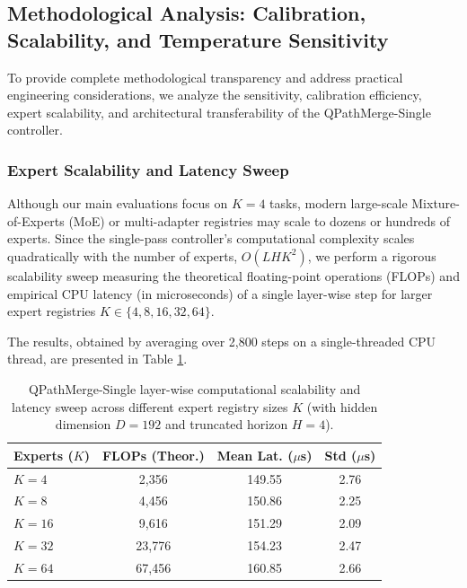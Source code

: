 \subsection{Methodological Analysis: Calibration, Scalability, and Temperature Sensitivity}
\label{subsec:method_analysis}

To provide complete methodological transparency and address practical engineering considerations, we analyze the sensitivity, calibration efficiency, expert scalability, and architectural transferability of the QPathMerge-Single controller.

\subsubsection{Expert Scalability and Latency Sweep}
Although our main evaluations focus on $K = 4$ tasks, modern large-scale Mixture-of-Experts (MoE) or multi-adapter registries may scale to dozens or hundreds of experts. Since the single-pass controller's computational complexity scales quadratically with the number of experts, $O(L H K^2)$, we perform a rigorous scalability sweep measuring the theoretical floating-point operations (FLOPs) and empirical CPU latency (in microseconds) of a single layer-wise step for larger expert registries $K \in \{4, 8, 16, 32, 64\}$.

The results, obtained by averaging over 2,800 steps on a single-threaded CPU thread, are presented in Table \ref{tab:scalability_sweep}.
\begin{table}[h]
\centering
\caption{QPathMerge-Single layer-wise computational scalability and latency sweep across different expert registry sizes $K$ (with hidden dimension $D = 192$ and truncated horizon $H = 4$).}
\label{tab:scalability_sweep}
\vskip 0.15in
\setlength{\tabcolsep}{2.0pt}
\begin{small}
\begin{sc}
\begin{tabular}{lccc}
\toprule
\textbf{Experts ($K$)} & \textbf{FLOPs (Theor.)} & \textbf{Mean Lat. ($\mu$s)} & \textbf{Std ($\mu$s)} \\
\midrule
$K = 4$  & 2,356  & 149.55 & 2.76 \\
$K = 8$  & 4,456  & 150.86 & 2.25 \\
$K = 16$ & 9,616  & 151.29 & 2.09 \\
$K = 32$ & 23,776 & 154.23 & 2.47 \\
$K = 64$ & 67,456 & 160.85 & 2.66 \\
\bottomrule
\end{tabular}
\end{sc}
\end{small}
\vskip -0.1in
\end{table}

